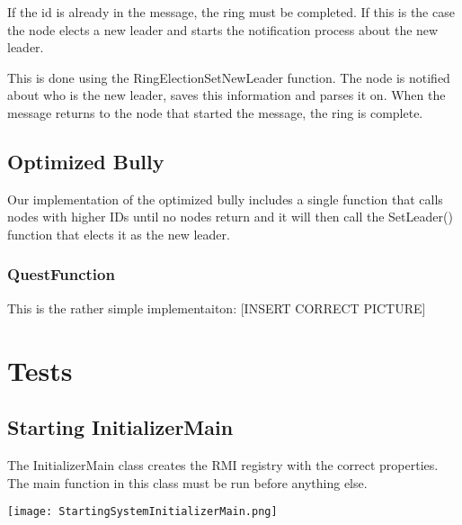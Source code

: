 If the id is already in the message, the ring must be completed. If this is the case the node elects a new leader and starts the notification process about the new leader.

This is done using the RingElectionSetNewLeader function. The node is notified about who is the new leader, saves this information and parses it on. When the message returns to the node that started the message, the ring is complete.

\begin{center}
\end{center}

\subsection{Optimized Bully}
Our implementation of the optimized bully includes a single function that calls nodes with higher IDs until no nodes return and it will then call the SetLeader() function that elects it as the new leader.

\subsubsection{QuestFunction}
This is the rather simple implementaiton:
[INSERT CORRECT PICTURE]
\begin{center}
\end{center}


\section{Tests}
\subsection{Starting InitializerMain}
The InitializerMain class creates the RMI registry with the correct properties. The main function in this class must be run before anything else. 

\begin{center}
	\texttt{[image: StartingSystemInitializerMain.png]}
\end{center}

